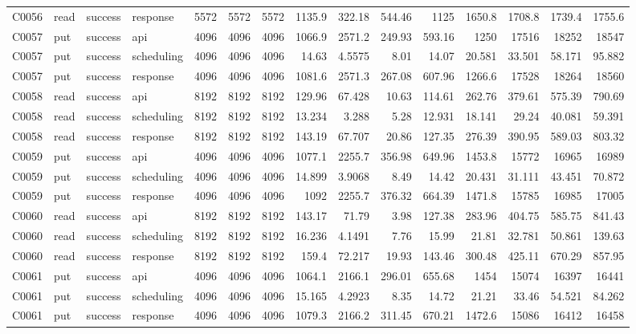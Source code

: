 \begin{landscape}
\begin{longtable}{llllrrrrrrrrrrr}
C0056 & read & success & response & 5572 & 5572 & 5572 & 1135.9 & 322.18 & 544.46 & 1125 & 1650.8 & 1708.8 & 1739.4 & 1755.6\\
C0057 & put & success & api & 4096 & 4096 & 4096 & 1066.9 & 2571.2 & 249.93 & 593.16 & 1250 & 17516 & 18252 & 18547\\
C0057 & put & success & scheduling & 4096 & 4096 & 4096 & 14.63 & 4.5575 & 8.01 & 14.07 & 20.581 & 33.501 & 58.171 & 95.882\\
C0057 & put & success & response & 4096 & 4096 & 4096 & 1081.6 & 2571.3 & 267.08 & 607.96 & 1266.6 & 17528 & 18264 & 18560\\
C0058 & read & success & api & 8192 & 8192 & 8192 & 129.96 & 67.428 & 10.63 & 114.61 & 262.76 & 379.61 & 575.39 & 790.69\\
C0058 & read & success & scheduling & 8192 & 8192 & 8192 & 13.234 & 3.288 & 5.28 & 12.931 & 18.141 & 29.24 & 40.081 & 59.391\\
C0058 & read & success & response & 8192 & 8192 & 8192 & 143.19 & 67.707 & 20.86 & 127.35 & 276.39 & 390.95 & 589.03 & 803.32\\
C0059 & put & success & api & 4096 & 4096 & 4096 & 1077.1 & 2255.7 & 356.98 & 649.96 & 1453.8 & 15772 & 16965 & 16989\\
C0059 & put & success & scheduling & 4096 & 4096 & 4096 & 14.899 & 3.9068 & 8.49 & 14.42 & 20.431 & 31.111 & 43.451 & 70.872\\
C0059 & put & success & response & 4096 & 4096 & 4096 & 1092 & 2255.7 & 376.32 & 664.39 & 1471.8 & 15785 & 16985 & 17005\\
C0060 & read & success & api & 8192 & 8192 & 8192 & 143.17 & 71.79 & 3.98 & 127.38 & 283.96 & 404.75 & 585.75 & 841.43\\
C0060 & read & success & scheduling & 8192 & 8192 & 8192 & 16.236 & 4.1491 & 7.76 & 15.99 & 21.81 & 32.781 & 50.861 & 139.63\\
C0060 & read & success & response & 8192 & 8192 & 8192 & 159.4 & 72.217 & 19.93 & 143.46 & 300.48 & 425.11 & 670.29 & 857.95\\
C0061 & put & success & api & 4096 & 4096 & 4096 & 1064.1 & 2166.1 & 296.01 & 655.68 & 1454 & 15074 & 16397 & 16441\\
C0061 & put & success & scheduling & 4096 & 4096 & 4096 & 15.165 & 4.2923 & 8.35 & 14.72 & 21.21 & 33.46 & 54.521 & 84.262\\
C0061 & put & success & response & 4096 & 4096 & 4096 & 1079.3 & 2166.2 & 311.45 & 670.21 & 1472.6 & 15086 & 16412 & 16458\\

\end{longtable}
\end{landscape}
